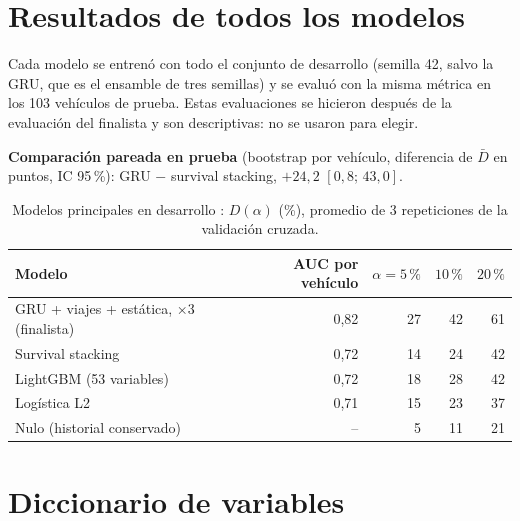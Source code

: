 \section{Resultados de todos los modelos}
\label{anx:modelos}

Cada modelo se entrenó con todo el conjunto de desarrollo (semilla 42, salvo la GRU, que es el ensamble de tres semillas) y
se evaluó con la misma métrica en los 103 vehículos de prueba. Estas evaluaciones se hicieron después de la evaluación del
finalista y son descriptivas: no se usaron para elegir.

\begin{table}[!htbp]
\centering
\caption{Detección $D(\alpha)$ (\%) en el conjunto de prueba según el presupuesto de falsas alarmas \tagtest{}. ``Prim.''
es $\bar D$, ec.~\eqref{eq:primario}.}
\label{tab:modelos-test}
\resizebox{\textwidth}{!}{}
\end{table}

\begin{table}[!htbp]
\centering
\caption{Con el umbral fijado en desarrollo \tagtest{}: detección y tasa de falsas alarmas realizada en prueba.}
\label{tab:operacion}

\end{table}

\textbf{Comparación pareada en prueba} (bootstrap por vehículo, diferencia de $\bar D$ en puntos, IC 95\,\%): GRU $-$
survival stacking, $+24{,}2$ $[0{,}8;\,43{,}0]$.

\begin{table}[!htbp]
\centering
\caption{Modelos principales en desarrollo \tagdev{}: $D(\alpha)$ (\%), promedio de 3 repeticiones de la validación cruzada.}
\label{tab:dev}
\begin{tabular}{@{}lrrrr@{}}
\toprule
Modelo & AUC por vehículo & $\alpha=5\,\%$ & $10\,\%$ & $20\,\%$ \\
\midrule
GRU + viajes + estática, ×3 (finalista) & 0,82 & 27 & 42 & 61 \\
Survival stacking & 0,72 & 14 & 24 & 42 \\
LightGBM (53 variables) & 0,72 & 18 & 28 & 42 \\
Logística L2 & 0,71 & 15 & 23 & 37 \\
Nulo (historial conservado) & -- & 5 & 11 & 21 \\
\bottomrule
\end{tabular}
\end{table}

\section{Diccionario de variables}
\label{anx:features}

